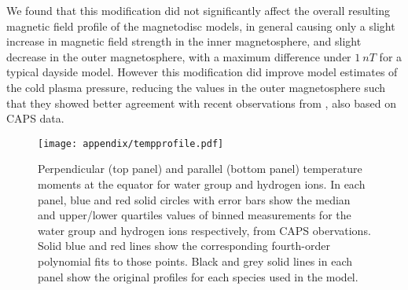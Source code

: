 We found that this modification did not significantly affect the overall resulting magnetic field profile of the magnetodisc models, in general causing only a slight increase in magnetic field strength in the inner magnetosphere, and slight decrease in the outer magnetosphere, with a maximum difference under $\SI{1}{nT}$ for a typical dayside model. However this modification did improve model estimates of the cold plasma pressure, reducing the values in the outer magnetosphere such that they showed better agreement with recent observations from \citet{sergis2017}, also based on CAPS data.

\begin{figure}
\centering
\texttt{[image: appendix/tempprofile.pdf]}
\caption[Equatorial profiles of temperature moments from \citet{wilson2017}, with best fit polynomials.]{Perpendicular (top panel) and parallel (bottom panel) temperature moments at the equator for water group and hydrogen ions. In each panel, blue and red solid circles with error bars show the median and upper/lower quartiles values of binned measurements for the water group and hydrogen ions respectively, from \citet{wilson2017} CAPS obervations. Solid blue and red lines show the corresponding fourth-order polynomial fits to those points. Black and grey solid lines in each panel show the original profiles for each species used in the \citet{achilleos2010b} model.}
\label{appendix:fig:tempprofile}
\end{figure}



